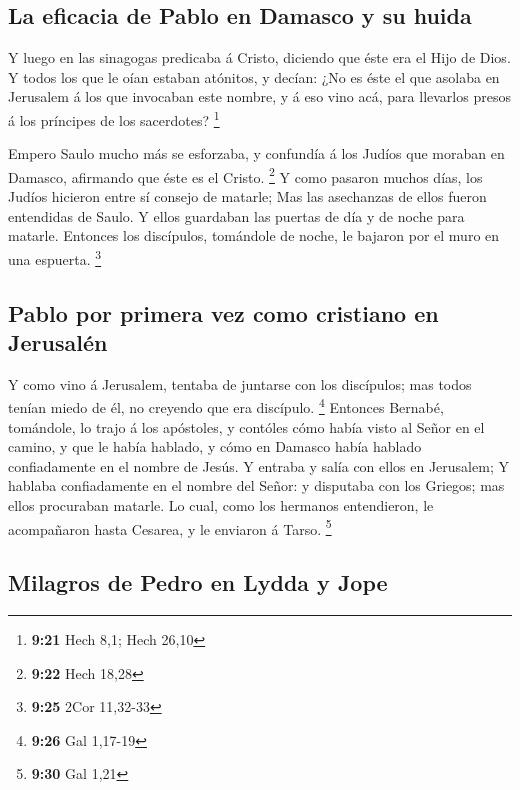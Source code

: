 \hypertarget{la-eficacia-de-pablo-en-damasco-y-su-huida}{%
\subsection{La eficacia de Pablo en Damasco y su
huida}\label{la-eficacia-de-pablo-en-damasco-y-su-huida}}

 Y luego en las sinagogas predicaba á Cristo, diciendo que
éste era el Hijo de Dios.  Y todos los que le oían estaban
atónitos, y decían: ¿No es éste el que asolaba en Jerusalem á los que
invocaban este nombre, y á eso vino acá, para llevarlos presos á los
príncipes de los sacerdotes? \footnote{\textbf{9:21} Hech 8,1; Hech
  26,10}

 Empero Saulo mucho más se esforzaba, y confundía á los
Judíos que moraban en Damasco, afirmando que éste es el Cristo.
\footnote{\textbf{9:22} Hech 18,28}  Y como pasaron muchos
días, los Judíos hicieron entre sí consejo de matarle;  Mas
las asechanzas de ellos fueron entendidas de Saulo. Y ellos guardaban
las puertas de día y de noche para matarle.  Entonces los
discípulos, tomándole de noche, le bajaron por el muro en una espuerta.
\footnote{\textbf{9:25} 2Cor 11,32-33}

\hypertarget{pablo-por-primera-vez-como-cristiano-en-jerusaluxe9n}{%
\subsection{Pablo por primera vez como cristiano en
Jerusalén}\label{pablo-por-primera-vez-como-cristiano-en-jerusaluxe9n}}

 Y como vino á Jerusalem, tentaba de juntarse con los
discípulos; mas todos tenían miedo de él, no creyendo que era discípulo.
\footnote{\textbf{9:26} Gal 1,17-19}  Entonces Bernabé,
tomándole, lo trajo á los apóstoles, y contóles cómo había visto al
Señor en el camino, y que le había hablado, y cómo en Damasco había
hablado confiadamente en el nombre de Jesús.  Y entraba y
salía con ellos en Jerusalem;  Y hablaba confiadamente en
el nombre del Señor: y disputaba con los Griegos; mas ellos procuraban
matarle.  Lo cual, como los hermanos entendieron, le
acompañaron hasta Cesarea, y le enviaron á Tarso. \footnote{\textbf{9:30}
  Gal 1,21}

\hypertarget{milagros-de-pedro-en-lydda-y-jope}{%
\subsection{Milagros de Pedro en Lydda y
Jope}\label{milagros-de-pedro-en-lydda-y-jope}}

